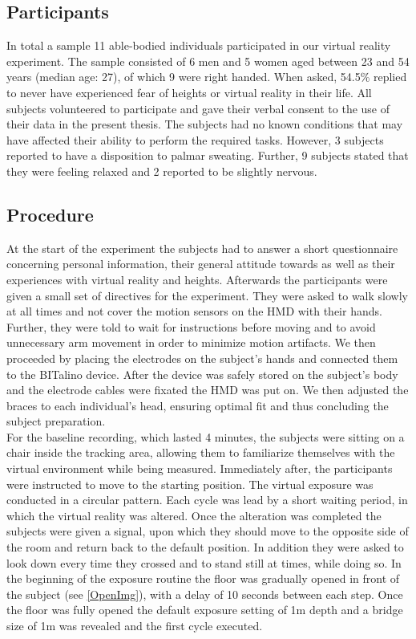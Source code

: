\subsection{Participants}
In total a sample 11 able-bodied individuals participated in our virtual reality experiment. The sample consisted of 6 men and 5 women aged between 23 and 54 years (median age: 27), of which 9 were right handed. When asked, 54.5\% replied to never have experienced fear of heights or virtual reality in their life. All subjects volunteered to participate and gave their verbal consent to the use of their data in the present thesis. The subjects had no known conditions that may have affected their ability to perform the required tasks. However, 3 subjects reported to have a disposition to palmar sweating. Further, 9 subjects stated that they were feeling relaxed and 2 reported to be slightly nervous.

\subsection{Procedure}
At the start of the experiment the subjects had to answer a short questionnaire concerning personal information, their general attitude towards as well as their experiences with virtual reality and heights. Afterwards the participants were given a small set of directives for the experiment. They were asked to walk slowly at all times and not cover the motion sensors on the HMD with their hands. Further, they were told to wait for instructions before moving and to avoid unnecessary arm movement in order to minimize motion artifacts. We then proceeded by placing the electrodes on the subject's hands and connected them to the BITalino device. After the device was safely stored on the subject's body and the electrode cables were fixated the HMD was put on. We then adjusted the braces to each individual's head, ensuring optimal fit and thus concluding the subject preparation.\\
For the baseline recording, which lasted 4 minutes, the subjects were sitting on a chair inside the tracking area, allowing them to familiarize themselves with the virtual environment while being measured. Immediately after, the participants were instructed to move to the starting position. The virtual exposure was conducted in a circular pattern. Each cycle was lead by a short waiting period, in which the virtual reality was altered. Once the alteration was completed the subjects were given a signal, upon which they should move to the opposite side of the room and return back to the default position. In addition they were asked to look down every time they crossed and to stand still at times, while doing so. In the beginning of the exposure routine the floor was gradually opened in front of the subject (see \ref{OpenImg}), with a delay of 10 seconds between each step. Once the floor was fully opened the default exposure setting of 1m depth and a bridge size of 1m was revealed and the first cycle executed.   

